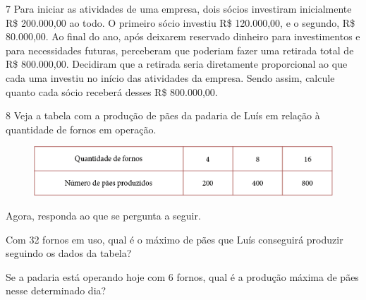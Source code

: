 
\num{7} Para iniciar as atividades de uma empresa, dois sócios investiram
inicialmente R\$ 200.000,00 ao todo. O primeiro
sócio investiu R\$ 120.000,00, e o segundo, R\$ 80.000,00. Ao final do ano,
após deixarem reservado dinheiro para investimentos e para necessidades
futuras, perceberam que poderiam fazer uma retirada total 
de R\$ 800.000,00. Decidiram que a retirada seria diretamente proporcional ao que
cada uma investiu no início das atividades da empresa. Sendo assim,
calcule quanto cada sócio receberá desses R\$ 800.000,00.


\num{8} Veja a tabela com a produção de pães da padaria de Luís 
em relação à quantidade de fornos em operação.

\begin{figure}[htpb!]
\centering
\includegraphics[width=\textwidth]{media/image71.png}
\end{figure}

Agora, responda ao que se pergunta a seguir.

\begin{escolha}
\item
  Com 32 fornos em uso, qual é o máximo de pães que Luís conseguirá
  produzir seguindo os dados da tabela?

\item
  Se a padaria está operando hoje com 6 fornos, qual é a produção máxima
  de pães nesse determinado dia?
\end{escolha}

